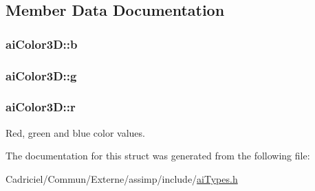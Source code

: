 \subsection{Member Data Documentation}
\hypertarget{structai_color3_d_a02ddcc7af11f7d4d6ea14f1bfb4ef6c7}{
\subsubsection[{b}]{ ai\-Color3\-D\-::b}}\label{structai_color3_d_a02ddcc7af11f7d4d6ea14f1bfb4ef6c7}
\hypertarget{structai_color3_d_a40ecdcee92b5373cbaa5e00ebcdb2cfb}{
\subsubsection[{g}]{ ai\-Color3\-D\-::g}}\label{structai_color3_d_a40ecdcee92b5373cbaa5e00ebcdb2cfb}
\hypertarget{structai_color3_d_a0ff704458aa26c84bbfe93b2dd89c630}{
\subsubsection[{r}]{ ai\-Color3\-D\-::r}}\label{structai_color3_d_a0ff704458aa26c84bbfe93b2dd89c630}


Red, green and blue color values. 



The documentation for this struct was generated from the following file\-:\begin{DoxyCompactItemize}
\item 
Cadriciel/\-Commun/\-Externe/assimp/include/\hyperlink{ai_types_8h}{ai\-Types.\-h}\end{DoxyCompactItemize}
